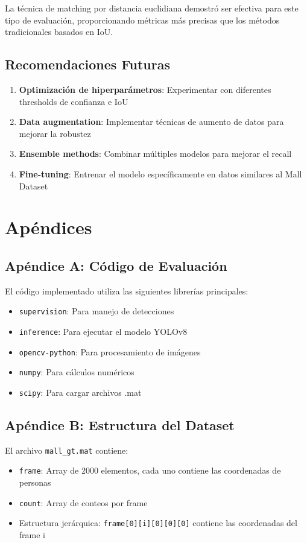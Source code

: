 \documentclass[12pt,a4paper]{article}
\begin{document}
La técnica de matching por distancia euclidiana demostró ser efectiva para este tipo de evaluación, proporcionando métricas más precisas que los métodos tradicionales basados en IoU.

\subsection{Recomendaciones Futuras}

\begin{enumerate}
    \item \textbf{Optimización de hiperparámetros}: Experimentar con diferentes thresholds de confianza e IoU
    \item \textbf{Data augmentation}: Implementar técnicas de aumento de datos para mejorar la robustez
    \item \textbf{Ensemble methods}: Combinar múltiples modelos para mejorar el recall
    \item \textbf{Fine-tuning}: Entrenar el modelo específicamente en datos similares al Mall Dataset
\end{enumerate}

\section{Apéndices}

\subsection{Apéndice A: Código de Evaluación}

El código implementado utiliza las siguientes librerías principales:
\begin{itemize}
    \item \texttt{supervision}: Para manejo de detecciones
    \item \texttt{inference}: Para ejecutar el modelo YOLOv8
    \item \texttt{opencv-python}: Para procesamiento de imágenes
    \item \texttt{numpy}: Para cálculos numéricos
    \item \texttt{scipy}: Para cargar archivos .mat
\end{itemize}

\subsection{Apéndice B: Estructura del Dataset}

El archivo \texttt{mall\_gt.mat} contiene:
\begin{itemize}
    \item \texttt{frame}: Array de 2000 elementos, cada uno contiene las coordenadas de personas
    \item \texttt{count}: Array de conteos por frame
    \item Estructura jerárquica: \texttt{frame[0][i][0][0][0]} contiene las coordenadas del frame i
\end{itemize}
\end{document}
